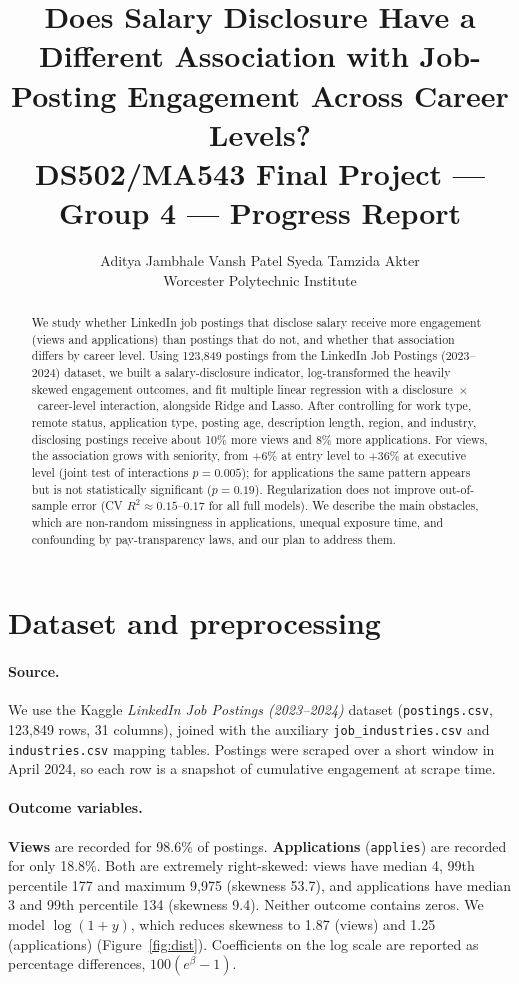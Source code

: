 \documentclass{article}
\title{Does Salary Disclosure Have a Different Association with Job-Posting Engagement Across Career Levels?\\[4pt]
\large DS502/MA543 Final Project --- Group 4 --- Progress Report}
\author{%
  Aditya Jambhale 
  \And
  Vansh Patel 
  \And
  Syeda Tamzida Akter \\ Worcester Polytechnic Institute
}
\begin{document}
\maketitle

\begin{abstract}
We study whether LinkedIn job postings that disclose salary receive more engagement (views and applications) than postings that do not, and whether that association differs by career level. Using 123,849 postings from the LinkedIn Job Postings (2023--2024) dataset, we built a salary-disclosure indicator, log-transformed the heavily skewed engagement outcomes, and fit multiple linear regression with a disclosure~$\times$~career-level interaction, alongside Ridge and Lasso. After controlling for work type, remote status, application type, posting age, description length, region, and industry, disclosing postings receive about 10\% more views and 8\% more applications. For views, the association grows with seniority, from $+6\%$ at entry level to $+36\%$ at executive level (joint test of interactions $p=0.005$); for applications the same pattern appears but is not statistically significant ($p=0.19$). Regularization does not improve out-of-sample error (CV $R^2\approx0.15$--$0.17$ for all full models). We describe the main obstacles, which are non-random missingness in applications, unequal exposure time, and confounding by pay-transparency laws, and our plan to address them.
\end{abstract}

\section{Dataset and preprocessing}
\label{sec:data}

\paragraph{Source.} We use the Kaggle \emph{LinkedIn Job Postings (2023--2024)} dataset (\texttt{postings.csv}, 123,849 rows, 31 columns), joined with the auxiliary \texttt{job\_industries.csv} and \texttt{industries.csv} mapping tables. Postings were scraped over a short window in April 2024, so each row is a snapshot of cumulative engagement at scrape time.

\paragraph{Outcome variables.} \textbf{Views} are recorded for 98.6\% of postings. \textbf{Applications} (\texttt{applies}) are recorded for only 18.8\%. Both are extremely right-skewed: views have median 4, 99th percentile 177 and maximum 9,975 (skewness 53.7), and applications have median 3 and 99th percentile 134 (skewness 9.4). Neither outcome contains zeros. We model $\log(1+y)$, which reduces skewness to 1.87 (views) and 1.25 (applications) (Figure~\ref{fig:dist}). Coefficients on the log scale are reported as percentage differences, $100(e^{\beta}-1)$.
\end{document}
